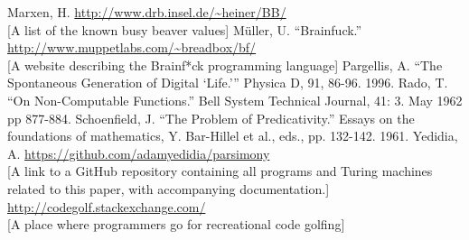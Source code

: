 \documentclass[11pt]{article}
\begin{document}
\begin{thebibliography}{100}
 Marxen, H.
\url{http://www.drb.insel.de/~heiner/BB/} \\
{[A list of the known busy beaver values]}
 M\"uller, U. ``Brainfuck.'' \url{http://www.muppetlabs.com/~breadbox/bf/} \\
{[A website describing the Brainf*ck programming language]}
 Pargellis, A. ``The Spontaneous Generation of Digital {`Life.'}'' Physica D, 91, 86-96. 1996.
 Rado, T. ``On Non-Computable Functions.'' Bell System Technical Journal, 41: 3. May 1962 pp 877-884.
 Schoenfield, J. ``The Problem of Predicativity.'' Essays on the foundations of mathematics, Y. Bar-Hillel et al., eds., pp. 132-142. 1961.
 Yedidia, A. \url{https://github.com/adamyedidia/parsimony} \\
{[A link to a GitHub repository containing all programs and Turing machines related to this paper, with accompanying documentation.]}
 \url{http://codegolf.stackexchange.com/} \\
{[A place where programmers go for recreational code golfing]}
\end{thebibliography}
\end{document}
